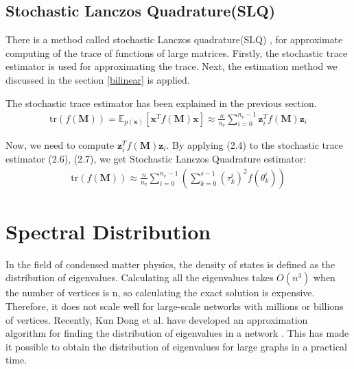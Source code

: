 \documentclass[senior,final,11pt]{iscs-thesis}
\begin{document}
\subsection{Stochastic Lanczos Quadrature(SLQ)}
There is a method called stochastic Lanczos quadrature(SLQ) \cite{ubaru2017fast}, for approximate computing of the trace of functions of large matrices. Firstly, the stochastic trace estimator is used for approximating the trace. Next, the estimation method we discussed in the section \ref{bilinear} is applied.

The stochastic trace estimator has been explained in the previous section.
\begin{align}
    \mathrm{tr}(f(\mathbf{M})) =\mathbb{E}_{p(\mathbf{x})}[\mathbf{x}^{T}f(\mathbf{M})\mathbf{x}] \approx \frac{n}{n_v}\sum_{i=0}^{n_v-1} \mathbf{z}_i^{T}f(\mathbf{M})\mathbf{z}_i
\end{align}

Now, we need to compute $\mathbf{z}_i^{T}f(\mathbf{M})\mathbf{z}_i$. By applying (2.4) to the stochastic trace estimator (2.6), (2.7), we get Stochastic Lanczos Quadrature estimator:
\begin{align}
    \mathrm{tr}(f(\mathbf{M})) \approx \frac{n}{n_v} \sum_{i=0}^{n_v-1}\left(\sum_{k=0}^{s-1} (\tau_k^i)^2 f(\theta_k^i) \right)
\end{align}



\section{Spectral Distribution}
In the field of condensed matter physics, the density of states is defined as the distribution of eigenvalues. Calculating all the eigenvalues takes $O(n^3)$ when the number of vertices is n, so calculating the exact solution is expensive. Therefore, it does not scale well for large-scale networks with millions or billions of vertices. Recently, Kun Dong et al.\cite{dong2019network} have developed an approximation algorithm for finding the distribution of eigenvalues in a network . This has made it possible to obtain the distribution of eigenvalues for large graphs in a practical time.
\end{document}

